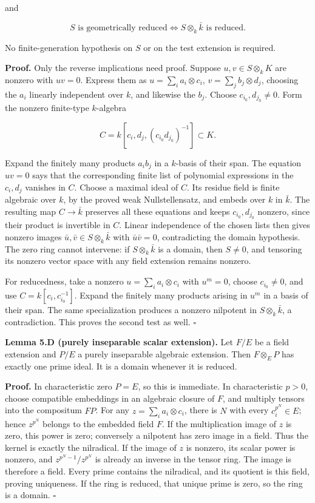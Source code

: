 \documentclass[
]{article}
\begin{document}
and

\[
S\text{ is geometrically reduced}
\Longleftrightarrow S\otimes_k\bar k\text{ is reduced}.
\]

No finite-generation hypothesis on \(S\) or on the test extension is
required.

\textbf{Proof.} Only the reverse implications need proof. Suppose
\(u,v\in S\otimes_k K\) are nonzero with \(uv=0\). Express them as
\(u=\sum_i a_i\otimes c_i\), \(v=\sum_j b_j\otimes d_j\), choosing the
\(a_i\) linearly independent over \(k\), and likewise the \(b_j\).
Choose \(c_{i_0},d_{j_0}\ne0\). Form the nonzero finite-type
\(k\)-algebra

\[
C=k[c_i,d_j,(c_{i_0}d_{j_0})^{-1}]\subset K.
\]

Expand the finitely many products \(a_ib_j\) in a \(k\)-basis of their
span. The equation \(uv=0\) says that the corresponding finite list of
polynomial expressions in the \(c_i,d_j\) vanishes in \(C\). Choose a
maximal ideal of \(C\). Its residue field is finite algebraic over
\(k\), by the proved weak Nullstellensatz, and embeds over \(k\) in
\(\bar k\). The resulting map \(C\to\bar k\) preserves all these
equations and keeps \(c_{i_0},d_{j_0}\) nonzero, since their product is
invertible in \(C\). Linear independence of the chosen lists then gives
nonzero images \(\bar u,\bar v\in S\otimes_k\bar k\) with
\(\bar u\bar v=0\), contradicting the domain hypothesis. The zero ring
cannot intervene: if \(S\otimes_k\bar k\) is a domain, then \(S\ne0\),
and tensoring its nonzero vector space with any field extension remains
nonzero.

For reducedness, take a nonzero \(u=\sum_i a_i\otimes c_i\) with
\(u^m=0\), choose \(c_{i_0}\ne0\), and use \(C=k[c_i,c_{i_0}^{-1}]\).
Expand the finitely many products arising in \(u^m\) in a basis of their
span. The same specialization produces a nonzero nilpotent in
\(S\otimes_k\bar k\), a contradiction. This proves the second test as
well. \(\square\)

\textbf{Lemma 5.D (purely inseparable scalar extension).} Let \(F/E\) be
a field extension and \(P/E\) a purely inseparable algebraic extension.
Then \(F\otimes_E P\) has exactly one prime ideal. It is a domain
whenever it is reduced.

\textbf{Proof.} In characteristic zero \(P=E\), so this is immediate. In
characteristic \(p>0\), choose compatible embeddings in an algebraic
closure of \(F\), and multiply tensors into the compositum \(FP\). For
any \(z=\sum_i a_i\otimes c_i\), there is \(N\) with every
\(c_i^{p^N}\in E\); hence \(z^{p^N}\) belongs to the embedded field
\(F\). If the multiplication image of \(z\) is zero, this power is zero;
conversely a nilpotent has zero image in a field. Thus the kernel is
exactly the nilradical. If the image of \(z\) is nonzero, its scalar
power is nonzero, and \(z^{p^N-1}/z^{p^N}\) is already an inverse in the
tensor ring. The image is therefore a field. Every prime contains the
nilradical, and its quotient is this field, proving uniqueness. If the
ring is reduced, that unique prime is zero, so the ring is a domain.
\(\square\)
\end{document}
